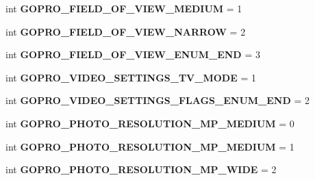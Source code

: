 \begin{DoxyCompactItemize}
int {\bfseries G\+O\+P\+R\+O\+\_\+\+F\+I\+E\+L\+D\+\_\+\+O\+F\+\_\+\+V\+I\+E\+W\+\_\+\+M\+E\+D\+I\+UM} = 1
\item 
\mbox{\label{namespacepymavlink_1_1dialects_1_1v10_af664fed49779c85f2755e88c0a0a87bf}} 
int {\bfseries G\+O\+P\+R\+O\+\_\+\+F\+I\+E\+L\+D\+\_\+\+O\+F\+\_\+\+V\+I\+E\+W\+\_\+\+N\+A\+R\+R\+OW} = 2
\item 
\mbox{\label{namespacepymavlink_1_1dialects_1_1v10_a9b9189b4084e0ca518b19f5c22ba1148}} 
int {\bfseries G\+O\+P\+R\+O\+\_\+\+F\+I\+E\+L\+D\+\_\+\+O\+F\+\_\+\+V\+I\+E\+W\+\_\+\+E\+N\+U\+M\+\_\+\+E\+ND} = 3
\item 
\mbox{\label{namespacepymavlink_1_1dialects_1_1v10_ad503290b25246b4821ba6d025e92de1e}} 
int {\bfseries G\+O\+P\+R\+O\+\_\+\+V\+I\+D\+E\+O\+\_\+\+S\+E\+T\+T\+I\+N\+G\+S\+\_\+\+T\+V\+\_\+\+M\+O\+DE} = 1
\item 
\mbox{\label{namespacepymavlink_1_1dialects_1_1v10_ae963c2cab8251beb6abfcd2a55e6baa4}} 
int {\bfseries G\+O\+P\+R\+O\+\_\+\+V\+I\+D\+E\+O\+\_\+\+S\+E\+T\+T\+I\+N\+G\+S\+\_\+\+F\+L\+A\+G\+S\+\_\+\+E\+N\+U\+M\+\_\+\+E\+ND} = 2
\item 
\mbox{\label{namespacepymavlink_1_1dialects_1_1v10_aa98ccd5944226f5b186bbd94685d77bb}} 
int {\bfseries G\+O\+P\+R\+O\+\_\+\+P\+H\+O\+T\+O\+\_\+\+R\+E\+S\+O\+L\+U\+T\+I\+O\+N\+\_\+M\+P\+\_\+\+M\+E\+D\+I\+UM} = 0
\item 
\mbox{\label{namespacepymavlink_1_1dialects_1_1v10_a2ef755baf2a6ed4c493f0f56013b1841}} 
int {\bfseries G\+O\+P\+R\+O\+\_\+\+P\+H\+O\+T\+O\+\_\+\+R\+E\+S\+O\+L\+U\+T\+I\+O\+N\+\_\+M\+P\+\_\+\+M\+E\+D\+I\+UM} = 1
\item 
\mbox{\label{namespacepymavlink_1_1dialects_1_1v10_ab237e93b9759cd179918486f151228de}} 
int {\bfseries G\+O\+P\+R\+O\+\_\+\+P\+H\+O\+T\+O\+\_\+\+R\+E\+S\+O\+L\+U\+T\+I\+O\+N\+\_\+M\+P\+\_\+\+W\+I\+DE} = 2
\item 
\mbox{\label{namespacepymavlink_1_1dialects_1_1v10_a05b6aa27685f3a65499157d7b26c92e0}} 

\end{DoxyCompactItemize}
